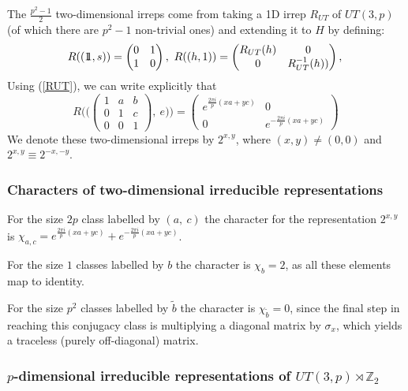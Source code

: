 \documentclass[12pt]{article}
\theoremstyle{definition}
\def\identity{{\rlap{1} \hskip 1.6pt \hbox{1}}}
\begin{document}
The $\frac{p^2 - 1}{2}$ two-dimensional irreps come from taking a 1D irrep $R_{UT}$ of $UT(3,p)$ (of which there are $p^2 - 1$ non-trivial ones) and extending it to $H$ by defining:
\begin{equation}
R((\identity,s)) =
\begin{pmatrix}
0 & 1 \\
1 & 0
\end{pmatrix},~R((h,1)) =
\begin{pmatrix}
R_{UT} (h) & 0 \\
0 & R^{-1}_{UT} (h))
\end{pmatrix},\\
\end{equation}
Using (\ref{RUT}), we can write explicitly that
\begin{equation}
R \bigg( \bigg(
\begin{pmatrix}
1 & a & b \\
0 & 1 & c \\
0 & 0 & 1
\end{pmatrix},~e \bigg) \bigg) =
\begin{pmatrix}
e^{\frac{2 \pi i}{p} (x a + y c)} & 0 \\
0 & e^{-\frac{2 \pi i}{p} (x a + y c)}
\end{pmatrix}
\end{equation}
We denote these two-dimensional irreps by $2^{x,y}$, where $(x,y) \ne (0,0)$ and $2^{x,y} \equiv 2^{-x,-y}$.

\subsubsection*{Characters of two-dimensional irreducible representations}

For the size $2p$ class labelled by $(a,~c)$ the character for the representation $2^{x,y}$ is $\chi_{a,c} = e^{\frac{2 \pi i}{p} (x a + y c)} + e^{-\frac{2 \pi i}{p} (x a + y c)}$.

For the size $1$ classes labelled by $b$ the character is $\chi_b = 2$, as all these elements map to identity.

For the size $p^2$ classes labelled by $\tilde{b}$ the character is $\chi_{\tilde{b}} = 0$, since the final step in reaching this conjugacy class is multiplying a diagonal matrix by $\sigma_x$, which yields a traceless (purely off-diagonal) matrix.

\subsubsection*{$p$-dimensional irreducible representations of $UT(3,p) \rtimes \mathbb{Z}_2$}
\end{document}
